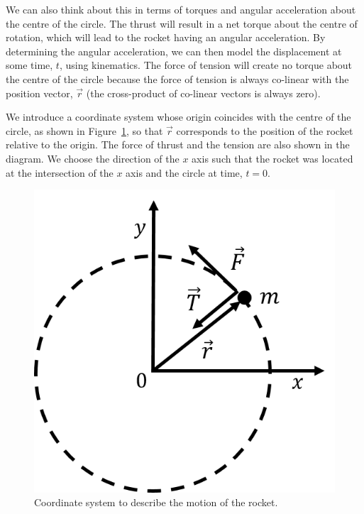 \begin{framed}
\begin{framed}
We can also think about this in terms of torques and angular acceleration about the centre of the circle. The thrust will result in a net torque about the centre of rotation, which will lead to the rocket having an angular acceleration. By determining the angular acceleration, we can then model the displacement at some time, $t$, using kinematics. The force of tension will create no torque about the centre of the circle because the force of tension is always co-linear with the position vector, $\vec r$ (the cross-product of co-linear vectors is always zero).

We introduce a coordinate system whose origin coincides with the centre of the circle, as shown in Figure~\ref{fig:rotationaldynamics:rocket_fbd}, so that $\vec r$ corresponds to the position of the rocket relative to the origin.  The force of thrust and the tension are also shown in the diagram. We choose the direction of the $x$ axis such that the rocket was located at the intersection of the $x$ axis and the circle at time, $t=0$.

\begin{figure}[!htbp]
\centering
\includegraphics[width=0.375\linewidth]{files/rocket_fbd-9f43c335ae6a2dbd1e2cd746d16b8a55.png}
\caption[]{Coordinate system to describe the motion of the rocket.}
\label{fig:rotationaldynamics:rocket_fbd}
\end{figure}


\end{framed}
\end{framed}
